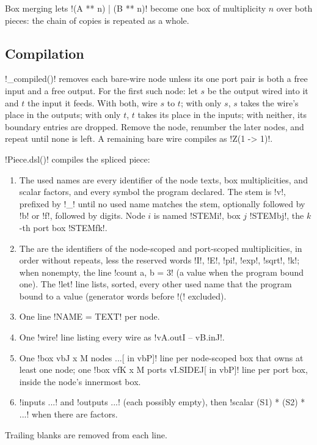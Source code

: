 Box merging lets \py!(A ** n) | (B ** n)! become one box of multiplicity $n$ over both pieces: the chain of copies is repeated as a whole.

\subsection{Compilation}

\begin{algorithm}\label{alg:python-api-compiled}
\leavevmode
\py!_compiled()! removes each bare-wire node unless its one port pair is both a free input and a free output. For the first such node: let $s$ be the output wired into it and $t$ the input it feeds. With both, wire $s$ to $t$; with only $s$, $s$ takes the wire's place in the outputs; with only $t$, $t$ takes its place in the inputs; with neither, its boundary entries are dropped. Remove the node, renumber the later nodes, and repeat until none is left. A remaining bare wire compiles as \code!Z(1 -> 1)!.
\end{algorithm}

\begin{algorithm}\label{alg:python-api-dsl}
\leavevmode
\py!Piece.dsl()! compiles the spliced piece:
\begin{enumerate}
\item The used names are every identifier of the node texts, box multiplicities, and scalar factors, and every symbol the program declared. The stem is \code!v!, prefixed by \code!_! until no used name matches the stem, optionally followed by \code!b! or \code!f!, followed by digits. Node $i$ is named \code!STEMi!, box $j$ \code!STEMbj!, the $k$-th port box \code!STEMfk!.
\item The  are the identifiers of the node-scoped and port-scoped multiplicities, in order without repeats, less the reserved words \code!I!, \code!E!, \code!pi!, \code!exp!, \code!sqrt!, \code!k!; when nonempty, the line \code!count a, b = 3! (a value when the program bound one). The \code!let! line lists, sorted, every other used name that the program bound to a value (generator words before \code!(! excluded).
\item One line \code!NAME = TEXT! per node.
\item One \code!wire! line listing every wire as \code!vA.outI -- vB.inJ!.
\item One \code!box vbJ x M nodes ...[ in vbP]! line per node-scoped box that owns at least one node; one \code!box vfK x M ports vI.SIDEJ[ in vbP]! line per port box, inside the node's innermost box.
\item \code!inputs ...! and \code!outputs ...! (each possibly empty), then \code!scalar (S1) * (S2) * ...! when there are factors.
\end{enumerate}
Trailing blanks are removed from each line.
\end{algorithm}

